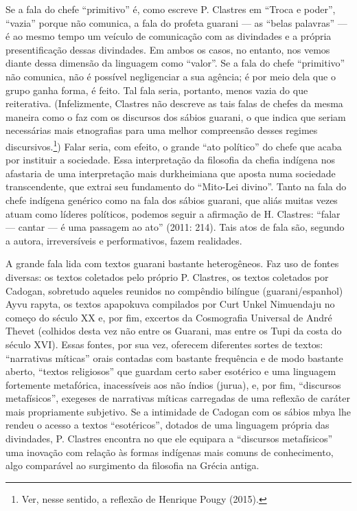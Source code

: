 Se a fala do chefe ``primitivo'' é, como escreve P. Clastres em ``Troca e
poder'', ``vazia'' porque não comunica, a fala do profeta guarani — as
``belas palavras'' — é ao mesmo tempo um veículo de comunicação com as
divindades e a própria presentificação dessas divindades. Em ambos os
casos, no entanto, nos vemos diante dessa dimensão da linguagem como
``valor''. Se a fala do chefe ``primitivo'' não comunica, não é possível
negligenciar a sua agência; é por meio dela que o grupo ganha forma, é
feito. Tal fala seria, portanto, menos vazia do que reiterativa.
(Infelizmente, Clastres não descreve as tais falas de chefes da mesma
maneira como o faz com os discursos dos sábios guarani, o que indica
que seriam necessárias mais etnografias para uma melhor compreensão
desses regimes discursivos.\footnote{Ver, nesse sentido, a reflexão de
Henrique Pougy (2015).}) Falar seria, com efeito, o grande ``ato
político'' do chefe que acaba por instituir a sociedade. Essa
interpretação da filosofia da chefia indígena nos afastaria de uma
interpretação mais durkheimiana que aposta numa sociedade
transcendente, que extrai seu fundamento do ``Mito-Lei divino''. Tanto na
fala do chefe indígena genérico como na fala dos sábios guarani, que
aliás muitas vezes atuam como líderes políticos, podemos seguir a
afirmação de H. Clastres: ``falar — cantar — é uma passagem ao ato''
(2011: 214). Tais atos de fala são, segundo a autora, irreversíveis e
performativos, fazem realidades. 

A grande fala lida com textos guarani bastante heterogêneos. Faz uso de
fontes diversas: os textos coletados pelo próprio P. Clastres, os
textos coletados por Cadogan, sobretudo aqueles reunidos no compêndio
bilíngue (guarani/espanhol) Ayvu rapyta, os textos apapokuva compilados
por Curt Unkel Nimuendaju no começo do século XX e, por fim, excertos
da Cosmografia Universal de André Thevet (colhidos desta vez não entre
os Guarani, mas entre os Tupi da costa do século XVI). Essas fontes,
por sua vez, oferecem diferentes sortes de textos: ``narrativas míticas''
orais contadas com bastante frequência e de modo bastante aberto,
``textos religiosos'' que guardam certo saber esotérico e uma linguagem
fortemente metafórica, inacessíveis aos não índios (jurua), e, por fim,
``discursos metafísicos'', exegeses de narrativas míticas carregadas de
uma reflexão de caráter mais propriamente subjetivo. Se a intimidade de
Cadogan com os sábios mbya lhe rendeu o acesso a textos ``esotéricos'',
dotados de uma linguagem própria das divindades, P. Clastres encontra
no que ele equipara a ``discursos metafísicos'' uma inovação com relação
às formas indígenas mais comuns de conhecimento, algo comparável ao
surgimento da filosofia na Grécia antiga.


